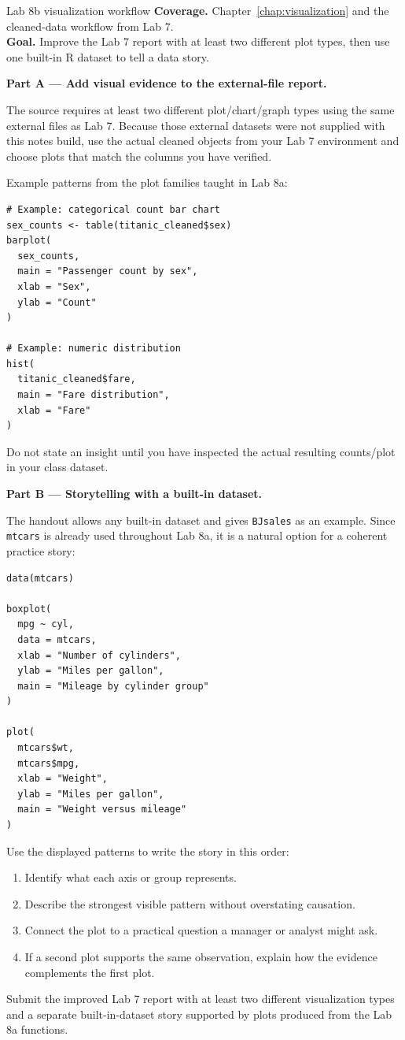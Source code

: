 
\begin{labproject}{Lab 8b visualization workflow}
\textbf{Coverage.} Chapter~\ref{chap:visualization} and the cleaned-data workflow from Lab 7.\\
\textbf{Goal.} Improve the Lab 7 report with at least two different plot types, then use one built-in R dataset to tell a data story.

\textbf{Part A --- Add visual evidence to the external-file report.}

The source requires at least two different plot/chart/graph types using the same external files as Lab 7. Because those external datasets were not supplied with this notes build, use the actual cleaned objects from your Lab 7 environment and choose plots that match the columns you have verified.

Example patterns from the plot families taught in Lab 8a:

\begin{lstlisting}[style=dsr]
# Example: categorical count bar chart
sex_counts <- table(titanic_cleaned$sex)
barplot(
  sex_counts,
  main = "Passenger count by sex",
  xlab = "Sex",
  ylab = "Count"
)

# Example: numeric distribution
hist(
  titanic_cleaned$fare,
  main = "Fare distribution",
  xlab = "Fare"
)
\end{lstlisting}

Do not state an insight until you have inspected the actual resulting counts/plot in your class dataset.

\textbf{Part B --- Storytelling with a built-in dataset.}

The handout allows any built-in dataset and gives \texttt{BJsales} as an example. Since \texttt{mtcars} is already used throughout Lab 8a, it is a natural option for a coherent practice story:

\begin{lstlisting}[style=dsr]
data(mtcars)

boxplot(
  mpg ~ cyl,
  data = mtcars,
  xlab = "Number of cylinders",
  ylab = "Miles per gallon",
  main = "Mileage by cylinder group"
)

plot(
  mtcars$wt,
  mtcars$mpg,
  xlab = "Weight",
  ylab = "Miles per gallon",
  main = "Weight versus mileage"
)
\end{lstlisting}

Use the displayed patterns to write the story in this order:
\begin{enumerate}
  \item Identify what each axis or group represents.
  \item Describe the strongest visible pattern without overstating causation.
  \item Connect the plot to a practical question a manager or analyst might ask.
  \item If a second plot supports the same observation, explain how the evidence complements the first plot.
\end{enumerate}
\end{labproject}

\begin{labdeliverable}
Submit the improved Lab 7 report with at least two different visualization types and a separate built-in-dataset story supported by plots produced from the Lab 8a functions.
\end{labdeliverable}
